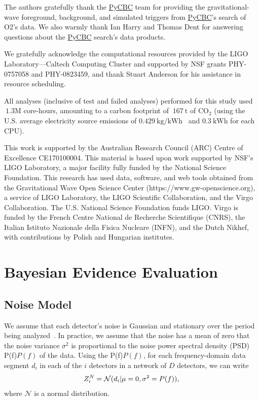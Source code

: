 \documentclass[
 nofootinbib,
 amsmath,amssymb,
 aps,
 twocolumn,
 superscriptaddress
]{revtex4-2}
\newcommand{\pycbc}{{\sc \href{https://pycbc.org/}{{PyCBC}}}\xspace}
\newcommand{\mathcmd}[1]{{\sc \relax\ifmmode#1\else $#1$\fi}\xspace}
\newcommand{\psd}{\mathcmd{P(f)}}
\begin{document}
\begin{acknowledgments}
The authors gratefully thank the \pycbc team for providing the gravitational-wave foreground, background, and simulated triggers from \pycbc's search of O2's data. We also warmly thank Ian Harry and Thomas Dent for answering questions about the \pycbc search's data products.  

We gratefully acknowledge the computational resources provided by the LIGO Laboratory—Caltech Computing Cluster and supported by NSF grants PHY-0757058 and PHY-0823459, and thank Stuart Anderson for his assistance in resource scheduling.

All analyses (inclusive of test and failed analyses) performed for this study used $~1.3\mathrm{M}$ core-hours, amounting to a carbon footprint of $~167\ \mathrm{t}$ of CO$_2$ (using the U.S. average electricity source emissions of $0.429\ \text{kg/kWh}$~\cite{greenhouse} and $0.3\ \text{kWh}$ for each CPU).

This work is supported by the Australian Research Council (ARC) Centre of Excellence CE170100004. This material is based upon work supported by NSF’s LIGO Laboratory, a major facility fully funded by the National Science Foundation. This research has used data, software, and web tools obtained from the Gravitational Wave Open Science Center (https://www.gw-openscience.org), a service of LIGO Laboratory, the LIGO Scientific Collaboration, and the Virgo Collaboration. The U.S. National Science Foundation funds LIGO. Virgo is funded by the French Centre National de Recherche Scientifique (CNRS), the Italian Istituto Nazionale della Fisica Nucleare (INFN), and the Dutch Nikhef, with contributions by Polish and Hungarian institutes.

\end{acknowledgments}

\appendix



\section{Bayesian Evidence Evaluation}\label{sec:bayesianEvidEval}

\subsection{Noise Model}
We assume that each detector's noise is Gaussian and stationary over the period being analyzed~\cite{ligo_psd}. In practice, we assume that the noise has a mean of zero that the noise variance $\sigma^2$ is proportional to the noise power spectral density (PSD) \psd of the data. Using the \psd, for each frequency-domain data segment $d_i$ in each of the $i$ detectors in a network of $D$ detectors, we can write 
\begin{equation}
\label{eq:zn}
Z^N_i = \mathcal{N}(d_i|\mu=0,\sigma^2=\psd),
\end{equation}
where $\mathcal{N}$ is a normal distribution. 
\end{document}
